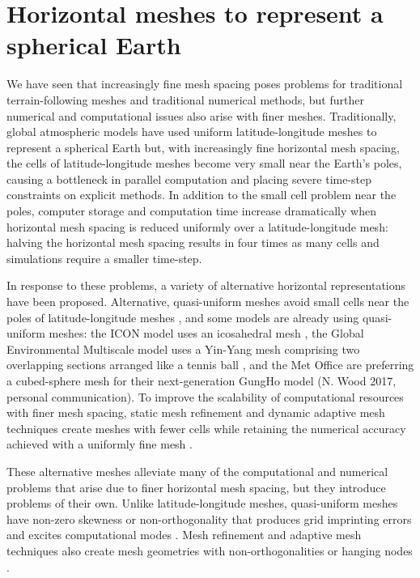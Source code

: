 \section{Horizontal meshes to represent a spherical Earth}

We have seen that increasingly fine mesh spacing poses problems for traditional terrain-following meshes and traditional numerical methods, but further numerical and computational issues also arise with finer meshes.
Traditionally, global atmospheric models have used uniform latitude-longitude meshes to represent a spherical Earth but, with increasingly fine horizontal mesh spacing, the cells of latitude-longitude meshes become very small near the Earth’s poles, causing a bottleneck in parallel computation \citep{staniforth-thuburn2012} and placing severe time-step constraints on explicit methods.
In addition to the small cell problem near the poles, computer storage and computation time increase dramatically when horizontal mesh spacing is reduced uniformly over a latitude-longitude mesh: halving the horizontal mesh spacing results in four times as many cells and simulations require a smaller time-step.

In response to these problems, a variety of alternative horizontal representations have been proposed.
Alternative, quasi-uniform meshes avoid small cells near the poles of latitude-longitude meshes \citep{staniforth-thuburn2012}, and some models are already using quasi-uniform meshes: the ICON model uses an icosahedral mesh \citep{zaengl2015}, the Global Environmental Multiscale model uses a Yin-Yang mesh comprising two overlapping sections arranged like a tennis ball \citep{qaddouri-lee2011}, and the Met Office are preferring a cubed-sphere mesh for their next-generation GungHo model (N. Wood 2017, personal communication).
To improve the scalability of computational resources with finer mesh spacing, static mesh refinement and dynamic adaptive mesh techniques create meshes with fewer cells while retaining the numerical accuracy achieved with a uniformly fine mesh \citep{jablonowski2009}.

These alternative meshes alleviate many of the computational and numerical problems that arise due to finer horizontal mesh spacing, but they introduce problems of their own. 
Unlike latitude-longitude meshes, quasi-uniform meshes have non-zero skewness or non-orthogonality that produces grid imprinting errors and excites computational modes \citep{weller2012}.
Mesh refinement and adaptive mesh techniques also create mesh geometries with non-orthogonalities or hanging nodes \citep{marras2016}.

